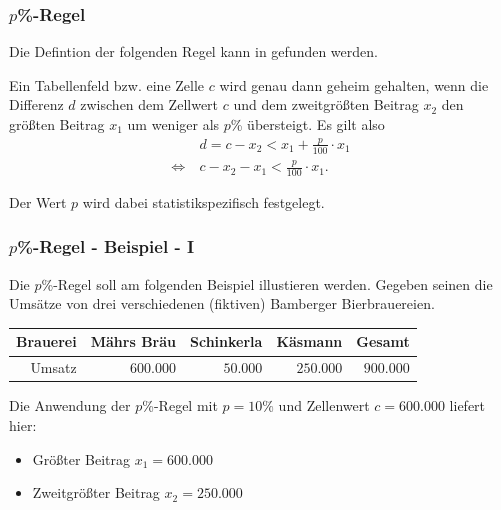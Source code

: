 \documentclass[aspectratio=169]{beamer}
\begin{document}
\begin{frame}
    \frametitle{$p$\%-Regel}
    Die Defintion der folgenden Regel kann in \cite{Rothe} gefunden werden.
    \begin{theorem}[$p$\%-Regel]
        Ein Tabellenfeld bzw. eine Zelle $c$ wird genau dann geheim gehalten, wenn die Differenz $d$ zwischen dem Zellwert $c$ und dem zweitgrößten Beitrag $x_2$ den größten Beitrag $x_1$ um weniger als $p$\% übersteigt. Es gilt also 
        \begin{align}
            & d = c - x_2 < x_1 + \frac{p}{100} \cdot x_1 \\
            \Leftrightarrow \: & c - x_2 - x_ 1 <  \frac{p}{100} \cdot x_1.
        \end{align}
    \end{theorem}
    Der Wert $p$ wird dabei statistikspezifisch festgelegt.
\end{frame}


\begin{frame}
    \frametitle{$p$\%-Regel - Beispiel - I}
    Die $p$\%-Regel soll am folgenden Beispiel illustieren werden. Gegeben seinen die Umsätze von drei verschiedenen (fiktiven) Bamberger Bierbrauereien.
    \begin{center}
        \begin{tabular}{ r r r r r }
            \textbf{Brauerei} \vline & \textbf{Mährs Bräu} & \textbf{Schinkerla} & \textbf{Käsmann} & \textbf{Gesamt} \\ 
            \hline
            Umsatz \vline & $600.000$ & $50.000$ & $250.000$ & $900.000$
           \end{tabular}
    \end{center}
    Die Anwendung der $p$\%-Regel mit $p = 10 \%$ und Zellenwert $c = 600.000$ liefert hier:
    \begin{itemize}
        \item Größter Beitrag $x_1 = 600.000$
        \item Zweitgrößter Beitrag $x_2 = 250.000$
    \end{itemize}
\end{frame}
\end{document}
